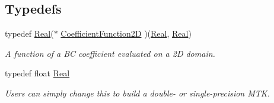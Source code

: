 \subsection*{Typedefs}
\begin{DoxyCompactItemize}
\item 
typedef \hyperlink{group__c01-roots_gac080bbbf5cbb5502c9f00405f894857d}{Real}($\ast$ \hyperlink{group__c07-mim__ops_ga0322dd5a158c1864242833ec224ee4c1}{Coefficient\+Function2\+D} )(\hyperlink{group__c01-roots_gac080bbbf5cbb5502c9f00405f894857d}{Real}, \hyperlink{group__c01-roots_gac080bbbf5cbb5502c9f00405f894857d}{Real})
\begin{DoxyCompactList}\small\item\em A function of a B\+C coefficient evaluated on a 2\+D domain. \end{DoxyCompactList}\item 
typedef float \hyperlink{group__c01-roots_gac080bbbf5cbb5502c9f00405f894857d}{Real}
\begin{DoxyCompactList}\small\item\em Users can simply change this to build a double-\/ or single-\/precision M\+T\+K. \end{DoxyCompactList}\end{DoxyCompactItemize}
